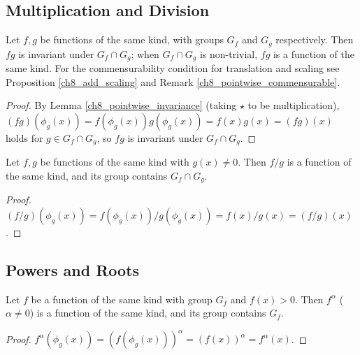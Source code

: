 \subsection{Multiplication and Division}

\begin{proposition}\label{prop:mult_all}
Let $f, g$ be functions of the same kind, with groups $G_f$ and $G_g$ respectively. Then $fg$ is invariant under $G_f \cap G_g$; when $G_f\cap G_g$ is non-trivial, $fg$ is a function of the same kind. For the commensurability condition for translation and scaling see Proposition \ref{ch8_add_scaling} and Remark \ref{ch8_pointwise_commensurable}.
\end{proposition}

\begin{proof}
By Lemma \ref{ch8_pointwise_invariance} (taking $\star$ to be multiplication), $(fg)(\phi_g(x)) = f(\phi_g(x))g(\phi_g(x)) = f(x)g(x) = (fg)(x)$ holds for $g\in G_f\cap G_g$, so $fg$ is invariant under $G_f\cap G_g$.
\end{proof}

\begin{proposition}\label{prop:division_all}
Let $f, g$ be functions of the same kind with $g(x) \neq 0$. Then $f/g$ is a function of the same kind, and its group contains $G_f \cap G_g$.
\end{proposition}

\begin{proof}
$(f/g)(\phi_g(x)) = f(\phi_g(x))/g(\phi_g(x)) = f(x)/g(x) = (f/g)(x)$.
\end{proof}

\subsection{Powers and Roots}

\begin{proposition}\label{prop:power_all}
Let $f$ be a function of the same kind with group $G_f$ and $f(x) > 0$. Then $f^\alpha$ ($\alpha \neq 0$) is a function of the same kind, and its group contains $G_f$.
\end{proposition}

\begin{proof}
$f^\alpha(\phi_g(x)) = (f(\phi_g(x)))^\alpha = (f(x))^\alpha = f^\alpha(x)$.
\end{proof}

